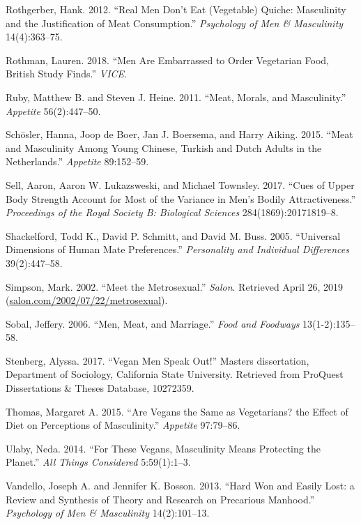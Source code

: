 \documentclass[twoside]{report}
\begin{document}
\hypertarget{rothgerber}{Rothgerber, Hank. 2012. ``Real Men Don't Eat (Vegetable) Quiche:
Masculinity and the Justification of Meat Consumption.''
\emph{Psychology of Men \& Masculinity} 14(4):363--75.}

\hypertarget{rothman}{Rothman, Lauren. 2018. ``Men Are Embarrassed to Order Vegetarian Food,
British Study Finds.'' \emph{VICE}.}

\hypertarget{ruby}{Ruby, Matthew B. and Steven J. Heine. 2011. ``Meat, Morals, and
Masculinity.'' \emph{Appetite} 56(2):447--50.}

\hypertarget{schosler}{Schösler, Hanna, Joop de Boer, Jan J. Boersema, and Harry Aiking. 2015.
``Meat and Masculinity Among Young Chinese, Turkish and Dutch Adults in
the Netherlands.'' \emph{Appetite} 89:152--59.}

\hypertarget{sell}{Sell, Aaron, Aaron W. Lukazsweski, and Michael Townsley. 2017. ``Cues of
Upper Body Strength Account for Most of the Variance in Men's Bodily
Attractiveness.'' \emph{Proceedings of the Royal Society B: Biological
Sciences} 284(1869):20171819--8.}

\hypertarget{shackelford}{Shackelford, Todd K., David P. Schmitt, and David M. Buss. 2005.
``Universal Dimensions of Human Mate Preferences.'' \emph{Personality
and Individual Differences} 39(2):447--58.}

\hypertarget{simpson}{Simpson, Mark. 2002. ``Meet the Metrosexual.'' \emph{Salon}. Retrieved
April 26, 2019
(\href{http://salon.com/2002/07/22/metrosexual}{salon.com/2002/07/22/metrosexual}).}

\hypertarget{sobal}{Sobal, Jeffery. 2006. ``Men, Meat, and Marriage.'' \emph{Food and
Foodways} 13(1-2):135--58.}

\hypertarget{stenberg}{Stenberg, Alyssa. 2017. ``Vegan Men Speak Out!'' Masters dissertation, Department of Sociology, California State University. Retrieved from ProQuest Dissertations \& Theses Database, 10272359.}
\pagebreak

\hypertarget{thomas}{Thomas, Margaret A. 2015. ``Are Vegans the Same as Vegetarians? the
Effect of Diet on Perceptions of Masculinity.'' \emph{Appetite}
97:79--86.}

\hypertarget{ulaby}{Ulaby, Neda. 2014. ``For These Vegans, Masculinity Means Protecting the
Planet.'' \emph{All Things Considered} 5:59(1):1--3.}

\hypertarget{vandello}{Vandello, Joseph A. and Jennifer K. Bosson. 2013. ``Hard Won and Easily
Lost: a Review and Synthesis of Theory and Research on Precarious
Manhood.'' \emph{Psychology of Men \& Masculinity} 14(2):101--13.}
\end{document}
